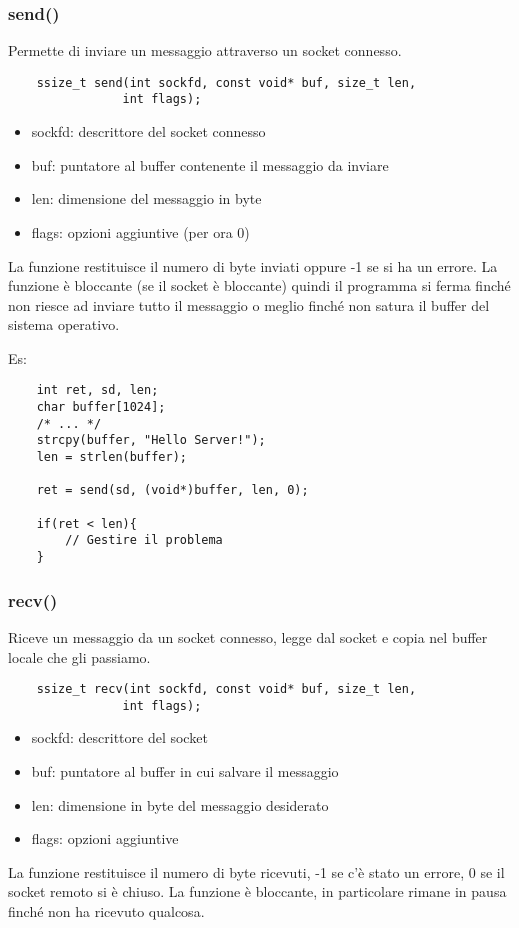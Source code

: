 \subsubsection{send()}
Permette di inviare un messaggio attraverso un socket connesso.
\begin{verbatim}
    ssize_t send(int sockfd, const void* buf, size_t len,
                int flags);
\end{verbatim}
\begin{itemize}
    \item sockfd: descrittore del socket connesso
    \item buf: puntatore al buffer contenente il messaggio da inviare
    \item len: dimensione del messaggio in byte
    \item flags: opzioni aggiuntive (per ora 0)
\end{itemize}
La funzione restituisce il numero di byte inviati oppure -1 se si ha un errore.
La funzione è bloccante (se il socket è bloccante) quindi il programma si ferma finché non riesce ad inviare tutto il messaggio o meglio finché non satura il buffer del sistema operativo.

Es:
\begin{verbatim}
    int ret, sd, len;
    char buffer[1024];
    /* ... */
    strcpy(buffer, "Hello Server!");
    len = strlen(buffer);

    ret = send(sd, (void*)buffer, len, 0);
    
    if(ret < len){
        // Gestire il problema
    }
\end{verbatim}

\subsubsection{recv()}
Riceve un messaggio da un socket connesso, legge dal socket e copia nel buffer locale che gli passiamo.
\begin{verbatim}
    ssize_t recv(int sockfd, const void* buf, size_t len,
                int flags);
\end{verbatim}
\begin{itemize}
    \item sockfd: descrittore del socket
    \item buf: puntatore al buffer in cui salvare il messaggio
    \item len: dimensione in byte del messaggio desiderato
    \item flags: opzioni aggiuntive
\end{itemize}
La funzione restituisce il numero di byte ricevuti, -1 se c'è stato un errore, 0 se il socket remoto si è chiuso.
La funzione è bloccante, in particolare rimane in pausa finché non ha ricevuto qualcosa.

